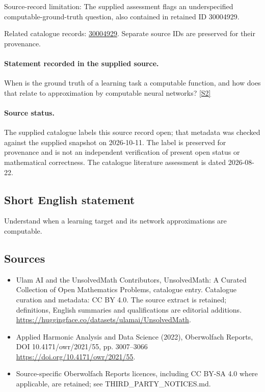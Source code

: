 \documentclass[11pt]{article}
\begin{document}
Source-record limitation: The supplied assessment flags an underspecified computable-ground-truth question, also contained in retained ID 30004929.

Related catalogue records: \href{https://mehmetmars7.github.io/Erdosproblems-llm-hunter/problem.html?type=open_problems&id=30004929}{30004929}. Separate source IDs are preserved for their provenance.
\paragraph{Statement recorded in the supplied source.}
When is the ground truth of a learning task a computable function, and how does that relate to approximation by computable neural networks? \href{https://doi.org/10.4171/owr/2021/55}{[S2]}
\paragraph{Source status.}
The supplied catalogue labels this source record open; that metadata was checked against the supplied snapshot on 2026-10-11. The label is preserved for provenance and is not an independent verification of present open status or mathematical correctness. The catalogue literature assessment is dated 2026-08-22.
\subsection{Short English statement}
Understand when a learning target and its network approximations are computable.
\subsection{Sources}
\begin{itemize}
\item[S1] Ulam AI and the UnsolvedMath Contributors, UnsolvedMath: A Curated Collection of Open Mathematics Problems, catalogue entry. Catalogue curation and metadata: CC BY 4.0. The source extract is retained; definitions, English summaries and qualifications are editorial additions.
\url{https://huggingface.co/datasets/ulamai/UnsolvedMath}.
\item[S2] Applied Harmonic Analysis and Data Science (2022), Oberwolfach Reports, DOI 10.4171/owr/2021/55, pp. 3007--3066
\url{https://doi.org/10.4171/owr/2021/55}.
\item Source-specific Oberwolfach Reports licences, including CC BY-SA 4.0 where applicable, are retained; see THIRD\_PARTY\_NOTICES.md.
\end{itemize}
\end{document}
